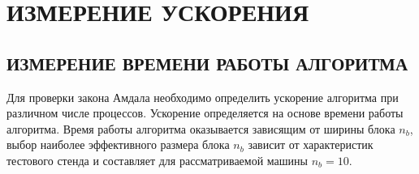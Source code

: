 \section{ИЗМЕРЕНИЕ УСКОРЕНИЯ}

\subsection{ИЗМЕРЕНИЕ ВРЕМЕНИ РАБОТЫ АЛГОРИТМА}

Для проверки закона Амдала необходимо определить ускорение алгоритма при различном числе процессов. Ускорение определяется на основе времени работы алгоритма. Время работы алгоритма оказывается зависящим от ширины блока $n_b$, выбор наиболее эффективного размера блока $n_b$ зависит от характеристик тестового стенда и составляет для рассматриваемой машины $n_b = 10$.

